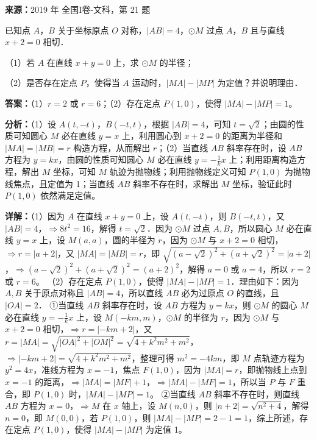 \begin{question}[points=12]
\textbf{来源：}2019 年 全国I卷-文科，第 21 题\par
已知点 $A$，$B$ 关于坐标原点 $O$ 对称，$|AB| = 4$，$\odot M$ 过点 $A$，$B$ 且与直线 $x+2=0$ 相切．

（1）若 $A$ 在直线 $x+y=0$ 上，求 $\odot M$ 的半径；

（2）是否存在定点 $P$，使得当 $A$ 运动时，$|MA| - |MP|$ 为定值？并说明理由．
\begin{solution}
\textbf{答案：}（1）$r=2$ 或 $r=6$；（2）存在定点 $P(1,0)$，使得 $|MA|-|MP|=1$。

\textbf{分析：}（1）设 $A(t,-t)$，$B(-t,t)$，根据 $|AB|=4$，可知 $t=\sqrt{2}$；由圆的性质可知圆心 $M$ 必在直线 $y=x$ 上，利用圆心到 $x+2=0$ 的距离为半径和 $|MA|=|MB|=r$ 构造方程，从而解出 $r$；（2）当直线 $AB$ 斜率存在时，设 $AB$ 方程为 $y=kx$，由圆的性质可知圆心 $M$ 必在直线 $y=-\frac{1}{k}x$ 上；利用距离构造方程，解出 $M$ 坐标，可知 $M$ 轨迹为抛物线；利用抛物线定义可知 $P(1,0)$ 为抛物线焦点，且定值为 1；当直线 $AB$ 斜率不存在时，求解出 $M$ 坐标，验证此时 $P(1,0)$ 依然满足定值。

\textbf{详解：}（1）因为 $A$ 在直线 $x+y=0$ 上，设 $A(t,-t)$，则 $B(-t,t)$，又 $|AB|=4$，$\Rightarrow 8t^2=16$，解得 $t=\sqrt{2}$．因为 $\odot M$ 过点 $A,B$，所以圆心 $M$ 必在直线 $y=x$ 上，设 $M(a,a)$，圆的半径为 $r$，因为 $\odot M$ 与 $x+2=0$ 相切，$\Rightarrow r=|a+2|$，又 $|MA|=|MB|=r$，即 $\sqrt{(a-\sqrt{2})^2+(a+\sqrt{2})^2}=|a+2|$，$\Rightarrow (a-\sqrt{2})^2+(a+\sqrt{2})^2 = (a+2)^2$，解得 $a=0$ 或 $a=4$，所以 $r=2$ 或 $r=6$。
（2）存在定点 $P(1,0)$，使得 $|MA|-|MP|=1$．理由如下：因为 $A,B$ 关于原点对称且 $|AB|=4$，所以直线 $AB$ 必为过原点 $O$ 的直线，且 $|OA|=2$．
①当直线 $AB$ 斜率存在时，设 $AB$ 方程为 $y=kx$，则 $\odot M$ 的圆心 $M$ 必在直线 $y=-\frac{1}{k}x$ 上，设 $M(-km,m)$，$\odot M$ 的半径为 $r$，因为 $\odot M$ 与 $x+2=0$ 相切，$\Rightarrow r=|-km+2|$，又 $r=|MA|=\sqrt{|OA|^2+|OM|^2}=\sqrt{4+k^2m^2+m^2}$，$\Rightarrow |-km+2|=\sqrt{4+k^2m^2+m^2}$，整理可得 $m^2=-4km$，即 $M$ 点轨迹方程为 $y^2=4x$，准线方程为 $x=-1$，焦点 $F(1,0)$，因为 $|MA|=r$，即抛物线上点到 $x=-1$ 的距离，$\Rightarrow |MA|=|MF|+1$，$\Rightarrow |MA|-|MF|=1$，所以当 $P$ 与 $F$ 重合，即 $P(1,0)$ 时，$|MA|-|MP|=1$。
②当直线 $AB$ 斜率不存在时，则直线 $AB$ 方程为 $x=0$，$\Rightarrow M$ 在 $x$ 轴上，设 $M(n,0)$，则 $|n+2|=\sqrt{n^2+4}$，解得 $n=0$，即 $M(0,0)$，若 $P(1,0)$，则 $|MA|-|MP|=2-1=1$，综上所述，存在定点 $P(1,0)$，使得 $|MA|-|MP|$ 为定值 1。
\end{solution}
\end{question}

